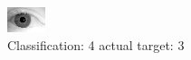 \begin{figure}[h!]
\begin{center}
\includegraphics[width=0.60\columnwidth]{figures/ID2070_class_4_target_3.png}
\end{center}
\caption{ Classification: 4 actual target: 3}
\label{fig:ID2070_class_4_target_3}
\end{figure}

